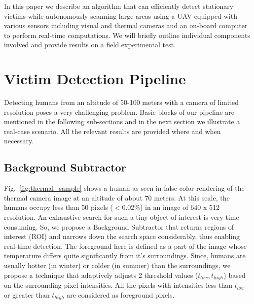 \documentclass[runningheads]{llncs}
\begin{document}
In this paper we describe an algorithm that can efficiently detect stationary victims while autonomously scanning large areas using a UAV equipped with various sensors including visual and thermal cameras and an on-board computer to perform real-time computations. We will briefly outline individual components involved and provide results on a field experimental test.

\section{Victim Detection Pipeline}
Detecting humans from an altitude of 50-100 meters with a camera of limited resolution poses a very challenging problem. Basic blocks of our pipeline are mentioned in the following sub-sections and in the next section we illustrate a real-case scenario. All the relevant results are provided where and when necessary.

\subsection{Background Subtractor}
Fig.~\ref{fig:thermal_sample} shows a human as seen in false-color rendering of the thermal camera image at an altitude of about 70 meters. At this scale, the humans occupy less than 50 pixels ($<$0.02\%) in an image of 640 x 512 resolution. An exhaustive search for such a tiny object of interest is very time consuming. So, we propose a Background Subtractor that returns regions of interest (ROI) and narrows down the search space considerably, thus enabling real-time detection. The foreground here is defined as a part of the image whose temperature differs quite significantly from it's surroundings. Since, humans are usually hotter (in winter) or colder (in summer) than the surroundings, we propose a technique that adaptively adjusts 2 threshold values ($t_{low}, t_{high}$) based on the surrounding pixel intensities. All the pixels with intensities less than $t_{low}$ or greater than $t_{high}$ are considered as foreground pixels.
\end{document}
